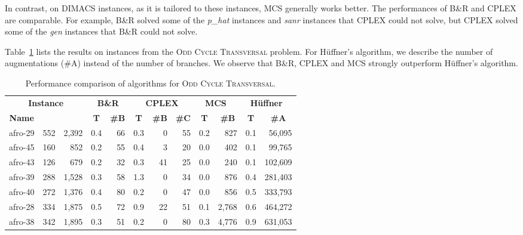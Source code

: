\documentclass[11pt]{article}
\newcommand{\OCT}{\textsc{Odd Cycle Transversal}\xspace}
\begin{document}
In contrast, on DIMACS instances, as it is tailored to these instances,
MCS generally works better.
The performances of B\&R and CPLEX are comparable.
For example, B\&R solved some of the \emph{p\_hat} instances and \emph{sanr} instances
that CPLEX could not solve,
but CPLEX solved some of the \emph{gen} instances that B\&R could not solve.


Table~\ref{tbl:comparison_oct} lists the results on instances from the \textsc{Odd Cycle Transversal} problem.
For H{\"u}ffner's algorithm,
we describe the number of augmentations (\#A) instead of the number of branches.
We observe that B\&R, CPLEX and MCS strongly outperform H{\"u}ffner's algorithm.

{
\begin{table}[p!]
\center
\caption{Performance comparison of algorithms for \OCT.}
\label{tbl:comparison_oct}
\fontsize{8pt}{0pt}\selectfont
\begin{tabular*}{\columnwidth}{@{\extracolsep{\fill}}lrr|rr|rrr|rr|rr}
\toprule
\multicolumn{3}{c|}{\textbf{Instance}} & \multicolumn{2}{c|}{\textbf{B\&R}}
 & \multicolumn{3}{c|}{\textbf{CPLEX}} & \multicolumn{2}{c|}{\textbf{MCS~\cite{clique/mcs_walcom10}}}
 & \multicolumn{2}{c}{\textbf{H{\"u}ffner~\cite{oct/huffner09}}} \\
\multicolumn{1}{c}{\textbf{Name}} &
\multicolumn{1}{c}{\textbf{}} &
\multicolumn{1}{c|}{\textbf{}} &
\multicolumn{1}{c}{\textbf{T}} &
\multicolumn{1}{c|}{\textbf{\#B}} &
\multicolumn{1}{c}{\textbf{T}} &
\multicolumn{1}{c}{\textbf{\#B}} &
\multicolumn{1}{c|}{\textbf{\#C}} &
\multicolumn{1}{c}{\textbf{T}} &
\multicolumn{1}{c|}{\textbf{\#B}} &
\multicolumn{1}{c}{\textbf{T}} &
\multicolumn{1}{c}{\textbf{\#A}} \\
\midrule
afro-29 & 552 & 2,392 & 0.4 & 66 & 0.3 & 0 & 55 & 0.2 & 827 & 0.1 & 56,095 \\
afro-45 & 160 & 852 & 0.2 & 55 & 0.4 & 3 & 20 & 0.0 & 402 & 0.1 & 99,765 \\
afro-43 & 126 & 679 & 0.2 & 32 & 0.3 & 41 & 25 & 0.0 & 240 & 0.1 & 102,609 \\
afro-39 & 288 & 1,528 & 0.3 & 58 & 1.3 & 0 & 34 & 0.0 & 876 & 0.4 & 281,403 \\
afro-40 & 272 & 1,376 & 0.4 & 80 & 0.2 & 0 & 47 & 0.0 & 856 & 0.5 & 333,793 \\
afro-28 & 334 & 1,875 & 0.5 & 72 & 0.9 & 22 & 51 & 0.1 & 2,768 & 0.6 & 464,272 \\
afro-38 & 342 & 1,895 & 0.3 & 51 & 0.2 & 0 & 80 & 0.3 & 4,776 & 0.9 & 631,053 \\

\end{tabular*}
\end{table}}
\end{document}
